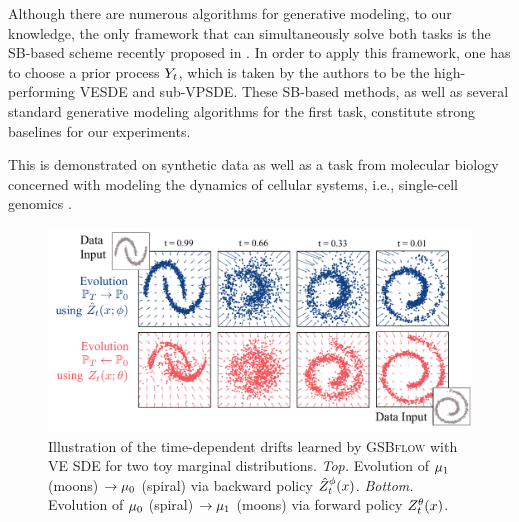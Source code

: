 Although there are numerous algorithms for generative modeling, to our knowledge, the only framework that can simultaneously solve both tasks is the \acrshort{SB}-based scheme recently proposed in \citep{chen2021likelihood}. In order to apply this framework, one has to choose a prior process $Y_{ t }$, which is taken by the authors to be the high-performing \acrshort{VESDE} and sub-\acrshort{VPSDE}. These \acrshort{SB}-based methods, as well as several standard generative modeling algorithms \citep{ho2020denoising, sohl2015deep, song2020score, huang2021variational, song2019generative, song2020score} for the first task, constitute strong baselines for our experiments.

This is demonstrated on synthetic data as well as a task from molecular biology concerned with modeling the dynamics of cellular systems, i.e., single-cell genomics \citep{macosko2015highly, frangieh2021multimodal, kulkarni2019beyond}.

\begin{figure}[t]
     \centering
         \centering
         \includegraphics[width=0.8\linewidth]{figures/fig_pred_gsbve_toy_spiral_moon.pdf}
         \caption{Illustration of the time-dependent drifts learned by \textsc{GSBflow} with VE SDE for two toy marginal distributions. \emph{Top.} Evolution of $\mu_1$ (moons) $\rightarrow \mu_0$ (spiral) via backward policy {\color{blue} $\SBb$}. \emph{Bottom.} Evolution of $\mu_0$ (spiral) $\rightarrow \mu_1$ (moons) via forward policy {\color{pink} $\SBf$}.}
        \label{fig:res_synthetic}
\end{figure}

